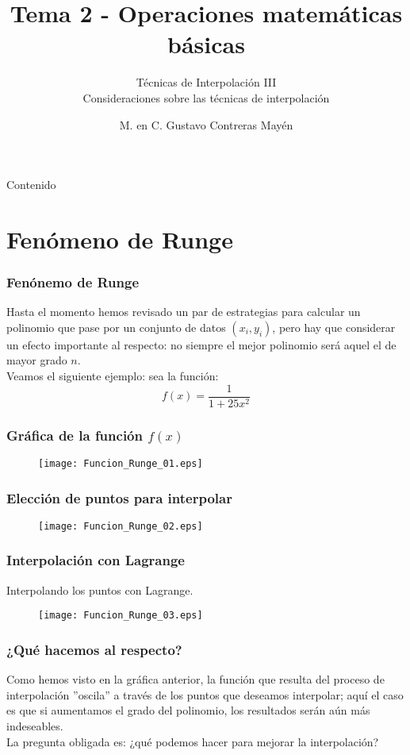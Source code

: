 

\title{Tema 2 - Operaciones matemáticas básicas}
\subtitle{Técnicas de Interpolación III \\ Consideraciones sobre las técnicas de interpolación}
\author[]{M. en C. Gustavo Contreras Mayén}

\maketitle
\fontsize{14}{14}\selectfont
{}
\begin{frame}{Contenido}
\tableofcontents[pausesections]
\end{frame}
\section{Fenómeno de Runge}
\begin{frame}
\frametitle{Fenónemo de Runge}
Hasta el momento hemos revisado un par de estrategias para calcular un polinomio que pase por un conjunto de datos $(x_{i}, y_{i})$, pero hay que considerar un efecto importante al respecto: no siempre el mejor polinomio será aquel el de mayor grado $n$.
\\
\medskip
Veamos el siguiente ejemplo: sea la función:
\[ f(x) = \dfrac{1}{1 + 25 x^{2}}\]
\end{frame}
\begin{frame}
\frametitle{Gráfica de la función $f(x)$}
\begin{figure}
	\centering
	\texttt{[image: Funcion\_Runge\_01.eps]} 
\end{figure}
\end{frame}
\begin{frame}
\frametitle{Elección de puntos para interpolar}
\begin{figure}
	\centering
	\texttt{[image: Funcion\_Runge\_02.eps]} 
\end{figure}
\end{frame}
\begin{frame}
\frametitle{Interpolación con Lagrange}
Interpolando los puntos con Lagrange.
\begin{figure}
	\centering
	\texttt{[image: Funcion\_Runge\_03.eps]} 
\end{figure}
\end{frame}
\begin{frame}
\frametitle{¿Qué hacemos al respecto?}
Como hemos visto en la gráfica anterior, la función que resulta del proceso de interpolación ''oscila'' a través de los puntos que deseamos interpolar; aquí el caso es que si aumentamos el grado del polinomio, los resultados serán aún más indeseables.
\\
\medskip
La pregunta obligada es: ¿qué podemos hacer para mejorar la interpolación?
\end{frame}
